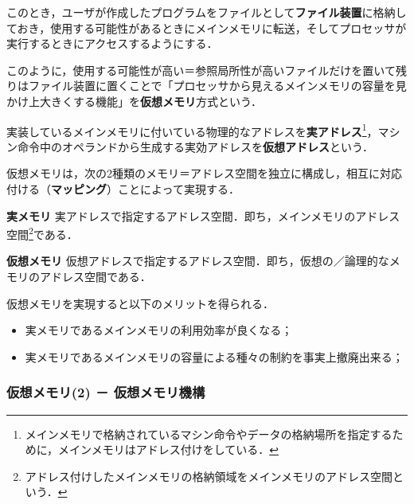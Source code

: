 このとき，ユーザが作成したプログラムをファイルとして\textbf{ファイル装置}に格納しておき，使用する可能性があるときにメインメモリに転送，そしてプロセッサが実行するときにアクセスするようにする．

このように，使用する可能性が高い＝参照局所性が高いファイルだけを置いて残りはファイル装置に置くことで「プロセッサから見えるメインメモリの容量を見かけ上大きくする機能」を\textbf{仮想メモリ}方式という．

実装しているメインメモリに付いている物理的なアドレスを\textbf{実アドレス}\footnote{メインメモリで格納されているマシン命令やデータの格納場所を指定するために，メインメモリはアドレス付けをしている．}，マシン命令中のオペランドから生成する実効アドレスを\textbf{仮想アドレス}という．

仮想メモリは，次の2種類のメモリ＝アドレス空間を独立に構成し，相互に対応付ける（\textbf{マッピング}）ことによって実現する．
\begin{enumerate}[label=\textbf{[\arabic*]}, labelsep=10pt, leftmargin=23pt]
	\item \textbf{実メモリ}\hspace*{3\zw} 実アドレスで指定するアドレス空間．即ち，メインメモリのアドレス空間\footnote{アドレス付けしたメインメモリの格納領域をメインメモリのアドレス空間という．}である．
	\item \textbf{仮想メモリ}\hspace*{2\zw} 仮想アドレスで指定するアドレス空間．即ち，仮想の／論理的なメモリのアドレス空間である．
\end{enumerate}

仮想メモリを実現すると以下のメリットを得られる．
\begin{itemize}
	\item 実メモリであるメインメモリの利用効率が良くなる；
	\item 実メモリであるメインメモリの容量による種々の制約を事実上撤廃出来る；
\end{itemize}



\subsubsection{仮想メモリ(2) － 仮想メモリ機構}\label{sec:com_arch-2-D-6}

